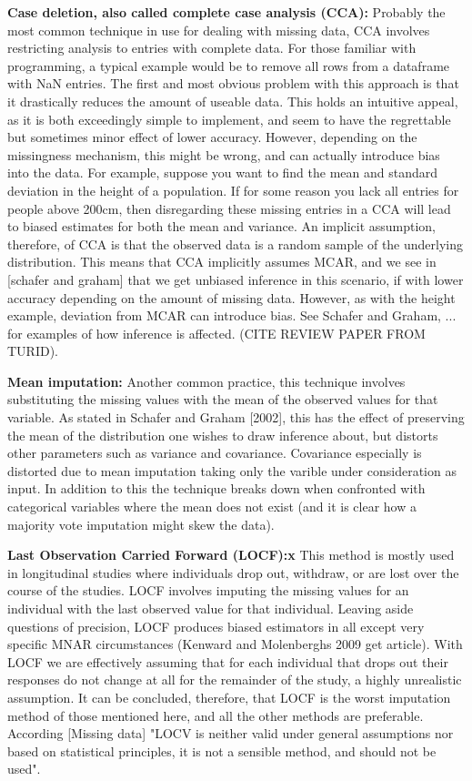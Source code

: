 \documentclass{article}
\begin{document}
	\textbf{Case deletion, also called complete case analysis (CCA):}
	Probably the most common technique in use for dealing with missing data, CCA involves restricting analysis to entries with complete data. For those familiar with programming, a typical example would be to remove all rows from a dataframe with NaN entries. The first and most obvious problem with this approach is that it drastically reduces the amount of useable data. This holds an intuitive appeal, as it is both exceedingly simple to implement, and seem to have the regrettable but sometimes minor effect of lower accuracy. However, depending on the missingness mechanism, this might be wrong, and can actually introduce bias into the data. For example, suppose you want to find the mean and standard deviation in the height of a population. If for some reason you lack all entries for people above 200cm, then disregarding these missing entries in a CCA will lead to biased estimates for both the mean and variance. An implicit assumption, therefore, of CCA is that the observed data is a random sample of the underlying distribution. This means that CCA implicitly assumes MCAR, and we see in [schafer and graham] that we get unbiased inference in this scenario, if with lower accuracy depending on the amount of missing data. However, as with the height example, deviation from MCAR can introduce bias. See Schafer and Graham, ... for examples of how inference is affected. (CITE REVIEW PAPER FROM TURID). 
	
	\textbf{Mean imputation:}
	Another common practice, this technique involves substituting the missing values with the mean of the observed values for that variable. As stated in Schafer and Graham [2002], this has the effect of preserving the mean of the distribution one wishes to draw inference about, but distorts other parameters such as variance and covariance. Covariance especially is distorted due to mean imputation taking only the varible under consideration as input. In addition to this the technique breaks down when confronted with categorical variables where the mean does not exist (and it is clear how a majority vote imputation might skew the data). %
	
	
	\textbf{Last Observation Carried Forward (LOCF):x}
	This method is mostly used in longitudinal studies where individuals drop out, withdraw, or are lost over the course of the studies. LOCF involves imputing the missing values for an individual with the last observed value for that individual. Leaving aside questions of precision, LOCF produces biased estimators in all except very specific MNAR circumstances (Kenward and Molenberghs 2009 get article). With LOCF we are effectively assuming that for each individual that drops out their responses do not change at all for the remainder of the study, a highly unrealistic assumption. It can be concluded, therefore, that LOCF is the worst imputation method of those mentioned here, and all the other methods are preferable. According [Missing data] "LOCV is neither valid under general assumptions nor based on statistical principles, it is not a sensible method, and should not be used".
	
\end{document}
